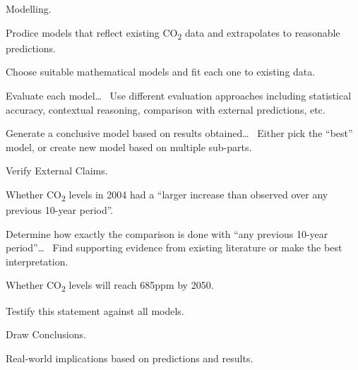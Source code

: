 \documentclass[12pt]{mcmthesis}
\begin{document}
    \begin{adjustwidth}{1cm}{}

        \noindent Modelling.

        \vspace{-6pt}
        \noindent Prodice models that reflect existing CO\textsubscript{2} data and extrapolates to reasonable predictions.

        \begin{adjustwidth}{1cm}{}
            \noindent Choose suitable mathematical models and fit each one to existing data.

            \noindent Evaluate each model\ldots~
            Use different evaluation approaches including statistical accuracy, contextual reasoning, comparison with external predictions, etc.

            \noindent Generate a conclusive model based on results obtained\ldots~
            Either pick the ``best'' model, or create new model based on multiple sub-parts.
        \end{adjustwidth}

        \noindent Verify External Claims.

        \begin{adjustwidth}{1cm}{}
            \noindent Whether CO\textsubscript{2} levels in 2004 had a ``larger increase than observed over any previous 10-year period''.

            \begin{adjustwidth}{1cm}{}
                \noindent Determine how exactly the comparison is done with ``any previous 10-year period''\ldots~
                Find supporting evidence from existing literature or make the best interpretation.
            \end{adjustwidth}

            \noindent Whether CO\textsubscript{2} levels will reach 685ppm by 2050.

            \begin{adjustwidth}{1cm}{}
                \noindent Testify this statement against all models.
            \end{adjustwidth}

        \end{adjustwidth}

        \noindent Draw Conclusions.

        \vspace{-6pt}
        \noindent Real-world implications based on predictions and results.

    \end{adjustwidth}
\end{document}
